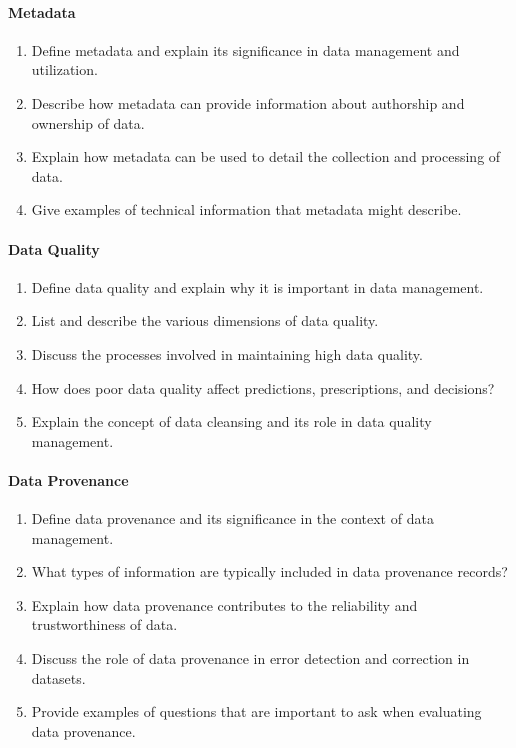 \paragraph*{Metadata}
\begin{enumerate}
    \item Define metadata and explain its significance in data management and utilization.
    \item Describe how metadata can provide information about authorship and ownership of data.
    \item Explain how metadata can be used to detail the collection and processing of data.
    \item Give examples of technical information that metadata might describe.
\end{enumerate}
\paragraph*{Data Quality}
\begin{enumerate}
    \item Define data quality and explain why it is important in data management.
    \item List and describe the various dimensions of data quality.
    \item Discuss the processes involved in maintaining high data quality.
    \item How does poor data quality affect predictions, prescriptions, and decisions?
    \item Explain the concept of data cleansing and its role in data quality management.
\end{enumerate}
\paragraph*{Data Provenance}
\begin{enumerate}
    \item Define data provenance and its significance in the context of data management.
    \item What types of information are typically included in data provenance records?
    \item Explain how data provenance contributes to the reliability and trustworthiness of data.
    \item Discuss the role of data provenance in error detection and correction in datasets.
    \item Provide examples of questions that are important to ask when evaluating data provenance.
\end{enumerate}
